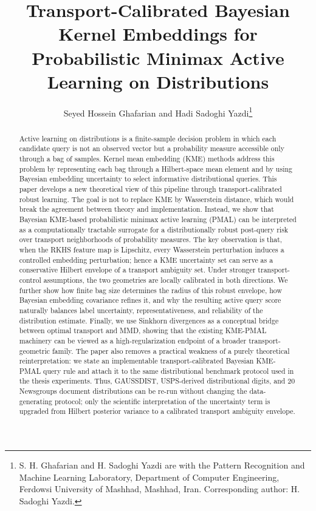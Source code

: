 \documentclass[10pt,journal]{IEEEtran}
\begin{document}
\title{Transport-Calibrated Bayesian Kernel Embeddings for Probabilistic Minimax Active Learning on Distributions}

\author{Seyed Hossein Ghafarian and Hadi Sadoghi Yazdi\thanks{S. H. Ghafarian and H. Sadoghi Yazdi are with the Pattern Recognition and Machine Learning Laboratory, Department of Computer Engineering, Ferdowsi University of Mashhad, Mashhad, Iran. Corresponding author: H. Sadoghi Yazdi.}}


\maketitle

\begin{abstract}
Active learning on distributions is a finite-sample decision problem in which each candidate query is not an observed vector but a probability measure accessible only through a bag of samples. Kernel mean embedding (KME) methods address this problem by representing each bag through a Hilbert-space mean element and by using Bayesian embedding uncertainty to select informative distributional queries. This paper develops a new theoretical view of this pipeline through transport-calibrated robust learning. The goal is not to replace KME by Wasserstein distance, which would break the agreement between theory and implementation. Instead, we show that Bayesian KME-based probabilistic minimax active learning (PMAL) can be interpreted as a computationally tractable surrogate for a distributionally robust post-query risk over transport neighborhoods of probability measures. The key observation is that, when the RKHS feature map is Lipschitz, every Wasserstein perturbation induces a controlled embedding perturbation; hence a KME uncertainty set can serve as a conservative Hilbert envelope of a transport ambiguity set. Under stronger transport-control assumptions, the two geometries are locally calibrated in both directions. We further show how finite bag size determines the radius of this robust envelope, how Bayesian embedding covariance refines it, and why the resulting active query score naturally balances label uncertainty, representativeness, and reliability of the distribution estimate. Finally, we use Sinkhorn divergences as a conceptual bridge between optimal transport and MMD, showing that the existing KME-PMAL machinery can be viewed as a high-regularization endpoint of a broader transport-geometric family. The paper also removes a practical weakness of a purely theoretical reinterpretation: we state an implementable transport-calibrated Bayesian KME-PMAL query rule and attach it to the same distributional benchmark protocol used in the thesis experiments. Thus, GAUSSDIST, USPS-derived distributional digits, and 20 Newsgroups document distributions can be re-run without changing the data-generating protocol; only the scientific interpretation of the uncertainty term is upgraded from Hilbert posterior variance to a calibrated transport ambiguity envelope.
\end{abstract}
\end{document}
